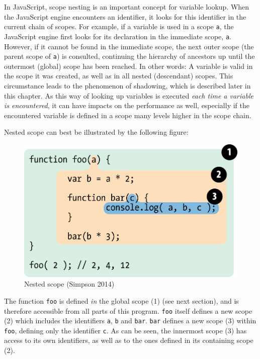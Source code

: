 In JavaScript, scope nesting is an important concept for variable
lookup. When the JavaScript engine encounters an identifier, it looks
for this identifier in the current chain of scopes. For example, if a
variable is used in a scope \texttt{a}, the JavaScript engine first
looks for its declaration in the immediate scope, \texttt{a}. However,
if it cannot be found in the immediate scope, the next outer scope (the
parent scope of \texttt{a}) is consulted, continuing the hierarchy of
ancestors up until the outermost (global) scope has been reached. In
other words: A variable is valid in the scope it was created, as well as
in all nested (descendant) scopes. This circumstance leads to the
phenomenon of shadowing, which is described later in this chapter. As
this way of looking up variables is executed \emph{each time a variable
is encountered}, it can have impacts on the performance as well,
especially if the encountered variable is defined in a scope many levels
higher in the scope chain.

Nested scope can best be illustrated by the following figure:

\begin{figure}[htbp]
\centering
\includegraphics[keepaspectratio]{img/fig2.png}
\caption{Nested scope (Simpson 2014)}
\label{fig:getify}
\end{figure}

The function \texttt{foo} is defined \emph{in} the global scope (1) (see
next section), and is therefore accessible from all parts of this
program. \texttt{foo} itself defines a new scope (2) which includes the
identifiers \texttt{a}, \texttt{b} and \texttt{bar}. \texttt{bar}
defines a new scope (3) within \texttt{foo}, defining only the
identifier \texttt{c}. As can be seen, the innermost scope (3) has
access to its own identifiers, as well as to the ones defined in its
containing scope (2).

